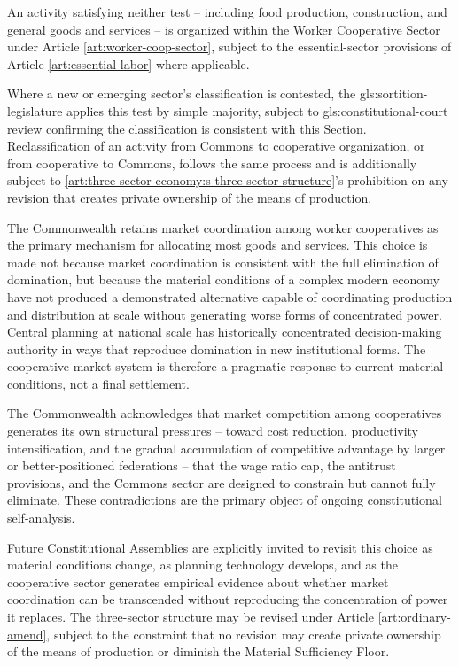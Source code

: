 An activity satisfying neither test -- including food production, construction, and general goods and services -- is organized within the Worker Cooperative Sector under Article \ref{art:worker-coop-sector}, subject to the essential-sector provisions of Article \ref{art:essential-labor} where applicable.

Where a new or emerging sector's classification is contested, the \gls{gls:sortition-legislature} applies this test by simple majority, subject to \gls{gls:constitutional-court} review confirming the classification is consistent with this Section. Reclassification of an activity from Commons to cooperative organization, or from cooperative to Commons, follows the same process and is additionally subject to \ref{art:three-sector-economy:s-three-sector-structure}'s prohibition on any revision that creates private ownership of the means of production.

The Commonwealth retains market coordination among worker cooperatives as the primary mechanism for allocating most goods and services. This choice is made not because market coordination is consistent with the full elimination of domination, but because the material conditions of a complex modern economy have not produced a demonstrated alternative capable of coordinating production and distribution at scale without generating worse forms of concentrated power. Central planning at national scale has historically concentrated decision-making authority in ways that reproduce domination in new institutional forms. The cooperative market system is therefore a pragmatic response to current material conditions, not a final settlement.

The Commonwealth acknowledges that market competition among cooperatives generates its own structural pressures -- toward cost reduction, productivity intensification, and the gradual accumulation of competitive advantage by larger or better-positioned federations -- that the wage ratio cap, the antitrust provisions, and the Commons sector are designed to constrain but cannot fully eliminate. These contradictions are the primary object of ongoing constitutional self-analysis.

Future Constitutional Assemblies are explicitly invited to revisit this choice as material conditions change, as planning technology develops, and as the cooperative sector generates empirical evidence about whether market coordination can be transcended without reproducing the concentration of power it replaces. The three-sector structure may be revised under Article \ref{art:ordinary-amend}, subject to the constraint that no revision may create private ownership of the means of production or diminish the Material Sufficiency Floor.

